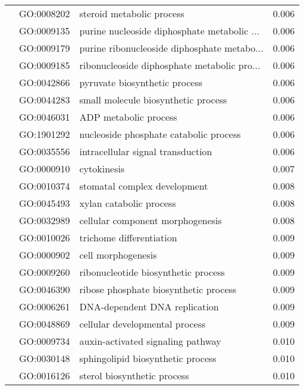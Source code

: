 \begin{longtable}{lllr}
   & GO:0008202 &                    steroid metabolic process &         0.006 \\
   & GO:0009135 &  purine nucleoside diphosphate metabolic ... &         0.006 \\
   & GO:0009179 &  purine ribonucleoside diphosphate metabo... &         0.006 \\
   & GO:0009185 &  ribonucleoside diphosphate metabolic pro... &         0.006 \\
   & GO:0042866 &                pyruvate biosynthetic process &         0.006 \\
   & GO:0044283 &          small molecule biosynthetic process &         0.006 \\
   & GO:0046031 &                        ADP metabolic process &         0.006 \\
   & GO:1901292 &       nucleoside phosphate catabolic process &         0.006 \\
   & GO:0035556 &            intracellular signal transduction &         0.006 \\
   & GO:0000910 &                                  cytokinesis &         0.007 \\
   & GO:0010374 &                 stomatal complex development &         0.008 \\
   & GO:0045493 &                      xylan catabolic process &         0.008 \\
   & GO:0032989 &             cellular component morphogenesis &         0.008 \\
   & GO:0010026 &                     trichome differentiation &         0.009 \\
   & GO:0000902 &                           cell morphogenesis &         0.009 \\
   & GO:0009260 &          ribonucleotide biosynthetic process &         0.009 \\
   & GO:0046390 &        ribose phosphate biosynthetic process &         0.009 \\
   & GO:0006261 &                DNA-dependent DNA replication &         0.009 \\
   & GO:0048869 &               cellular developmental process &         0.009 \\
   & GO:0009734 &            auxin-activated signaling pathway &         0.010 \\
   & GO:0030148 &            sphingolipid biosynthetic process &         0.010 \\
   & GO:0016126 &                  sterol biosynthetic process &         0.010 \\

\end{longtable}
